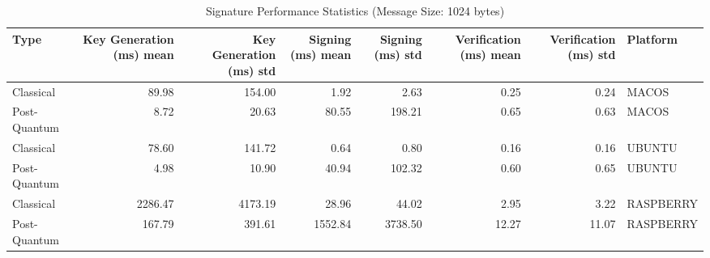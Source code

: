 \begin{table}
\caption{Signature Performance Statistics (Message Size: 1024 bytes)}
\label{tab:sig_platform_stats_1024}
\begin{tabular}{lrrrrrrl}
\toprule
Type & Key Generation (ms) mean & Key Generation (ms) std & Signing (ms) mean & Signing (ms) std & Verification (ms) mean & Verification (ms) std & Platform \\
\midrule
Classical & 89.98 & 154.00 & 1.92 & 2.63 & 0.25 & 0.24 & MACOS \\
Post-Quantum & 8.72 & 20.63 & 80.55 & 198.21 & 0.65 & 0.63 & MACOS \\
Classical & 78.60 & 141.72 & 0.64 & 0.80 & 0.16 & 0.16 & UBUNTU \\
Post-Quantum & 4.98 & 10.90 & 40.94 & 102.32 & 0.60 & 0.65 & UBUNTU \\
Classical & 2286.47 & 4173.19 & 28.96 & 44.02 & 2.95 & 3.22 & RASPBERRY \\
Post-Quantum & 167.79 & 391.61 & 1552.84 & 3738.50 & 12.27 & 11.07 & RASPBERRY \\
\bottomrule
\end{tabular}
\end{table}
